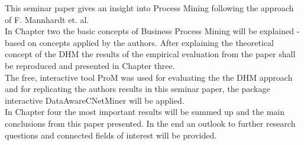 This seminar paper gives an insight into Process Mining following the approach of F. Mannhardt et. al. \\
In Chapter two the basic concepts of Business Process Mining will be explained - based on concepts applied by the authors. After explaining the theoretical concept of the DHM the results of the empirical evaluation from the paper shall be reproduced and presented in Chapter three.\\ 
The free, interactive tool \glqq{}ProM\grqq{} was used for evaluating the the DHM approach and for replicating the authors results in this seminar paper, the package \glqq interactive DataAwareCNetMiner\grqq{} will be applied.\\
In Chapter four the most important results will be summed up and the main conclusions from this paper presented. In the end an outlook to further research questions and connected fields of interest will be provided.